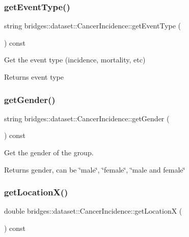 \subsubsection{\texorpdfstring{getEventType()}{getEventType()}}
{\footnotesize\ttfamily string bridges\+::dataset\+::\+Cancer\+Incidence\+::get\+Event\+Type (\begin{DoxyParamCaption}{ }\end{DoxyParamCaption}) const\hspace{0.3cm}{\ttfamily [inline]}}



Get the event type (incidence, mortality, etc) 

\begin{DoxyReturn}{Returns}
event type 
\end{DoxyReturn}
\mbox{\label{classbridges_1_1dataset_1_1_cancer_incidence_a0c4dcbde0ad1f81ffe4016c12d08c4c1}} 
\subsubsection{\texorpdfstring{getGender()}{getGender()}}
{\footnotesize\ttfamily string bridges\+::dataset\+::\+Cancer\+Incidence\+::get\+Gender (\begin{DoxyParamCaption}{ }\end{DoxyParamCaption}) const\hspace{0.3cm}{\ttfamily [inline]}}



Get the gender of the group. 

\begin{DoxyReturn}{Returns}
gender, can be \char`\"{}male\char`\"{}, \char`\"{}female\char`\"{}, \char`\"{}male and female\char`\"{} 
\end{DoxyReturn}
\mbox{\label{classbridges_1_1dataset_1_1_cancer_incidence_a982dc26b86ddeddf57d284b78dfd0752}} 
\subsubsection{\texorpdfstring{getLocationX()}{getLocationX()}}
{\footnotesize\ttfamily double bridges\+::dataset\+::\+Cancer\+Incidence\+::get\+LocationX (\begin{DoxyParamCaption}{ }\end{DoxyParamCaption}) const\hspace{0.3cm}{\ttfamily [inline]}}

